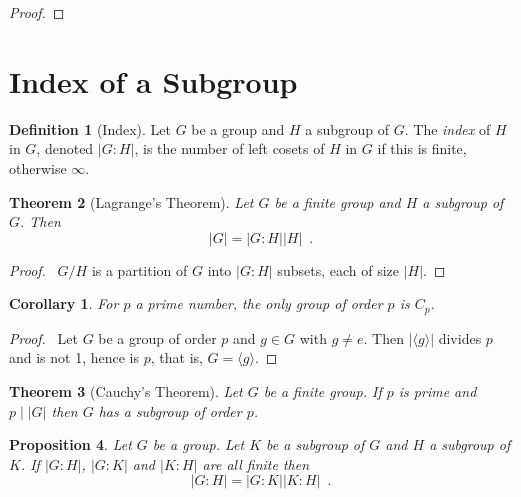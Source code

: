 \documentclass{book}
\let\qed\relax
\newtheorem{prop}{Proposition}[chapter]
\newtheorem{thm}[prop]{Theorem}
\newtheorem{cor}{Corollary}[prop]
\theoremstyle{definition}
\newtheorem{df}[prop]{Definition}
\begin{document}
\begin{proof}
\pf
{}
\qed
\end{proof}

\section{Index of a Subgroup}

\begin{df}[Index]
Let $G$ be a group and $H$ a subgroup of $G$. The \emph{index} of $H$ in $G$, denoted $|G:H|$, is the number of left cosets of $H$ in $G$ if this is finite, otherwise $\infty$.
\end{df}

\begin{thm}[Lagrange's Theorem]
Let $G$ be a finite group and $H$ a subgroup of $G$. Then
\[ |G| = |G : H| |H| \enspace . \]
\end{thm}

\begin{proof}
\pf\ $G/H$ is a partition of $G$ into $|G:H|$ subsets, each of size $|H|$. \qed
\end{proof}

\begin{cor}
For $p$ a prime number, the only group of order $p$ is $C_p$.
\end{cor}

\begin{proof}
\pf\ Let $G$ be a group of order $p$ and $g \in G$ with $g \neq e$. Then $|\langle g \rangle|$ divides $p$ and is not 1, hence is $p$, that is, $G = \langle g \rangle$. \qed
\end{proof}

\begin{thm}[Cauchy's Theorem]
Let $G$ be a finite group. If $p$ is prime and $p \mid |G|$ then $G$ has a subgroup of order $p$.
\end{thm}


\begin{prop}
Let $G$ be a group. Let $K$ be a subgroup of $G$ and $H$ a subgroup of $K$. If $|G:H|$, $|G:K|$ and $|K:H|$ are all finite then
\[ |G:H| = |G:K| |K:H| \enspace . \]
\end{prop}
\end{document}
